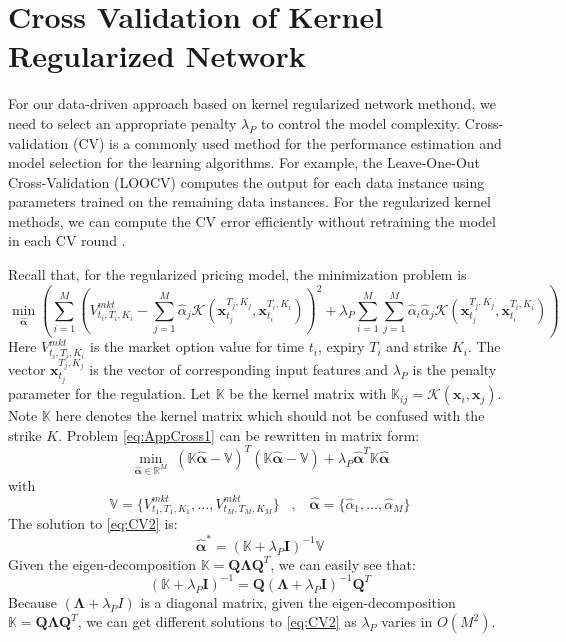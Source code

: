 \documentclass[letterpaper,12pt,titlepage,oneside,final]{book}
\numberwithin{equation}{section}
\theoremstyle{definition}
\newcommand{\vx}{\mathbf{x}}
\newcommand{\Real}{\mathbb{R}}
\newcommand{\valpha}{\pmb{\widehat{\alpha}}}
\newcommand{\vK}{\mathbb{K}}
\newcommand{\Vmkt}{V^{mkt}}
\newcommand{\vecVmkt}{\mathbb{V}}
\begin{document}
\chapter{Cross Validation of Kernel Regularized Network} \label{sec:cross}
\renewcommand{\theequation}{\thechapter.\arabic{equation}}
\renewcommand{\thethm}{\thechapter.\arabic{thm}}
 For our data-driven approach based on kernel regularized network methond, we need to select an appropriate penalty $\lambda_P$ to control the model complexity. Cross-validation (CV) is a commonly used method for the performance estimation and model selection for the learning algorithms. For example, the Leave-One-Out Cross-Validation (LOOCV) computes the output for each data instance using parameters trained on the remaining data instances. For the regularized kernel methods, we can compute the CV error efficiently without retraining the model in each CV round \cite{pahikkala2006fast, wahba1990spline}. 


Recall that, for the regularized  pricing model, the minimization problem is
\begin{equation}
\min_{\mathbf{\valpha}} \left(  \sum_{i=1}^M \left( \Vmkt_{t_i,T_i,K_i}-\sum_{j=1}^M \widehat{\alpha}_j \mathcal{K}(\vx_{t_j}^{T_j,K_j},\vx_{t_i}^{T_i,K_i}) \right)^2+\lambda_P \sum_{i=1}^M\sum_{j=1}^M  \widehat{\alpha}_i \widehat{\alpha}_j \mathcal{K}(\vx_{t_j}^{T_j,K_j},\vx_{t_i}^{T_i,K_i})\right)
\label{eq:AppCross1}
\end{equation}
Here $\Vmkt_{t_i,T_i,K_i}$ is the market option value for time $t_i$, expiry $T_i$ and strike $K_i$. The vector $\vx_{t_j}^{T_j,K_j}$ is the vector of  corresponding input features and $\lambda_P$ is the penalty parameter for the regulation. Let $\vK$ be the kernel matrix with $\vK_{ij}=\mathcal{K}(\mathbf{x}_i,\mathbf{x}_j)$. Note $\vK$ here denotes the kernel matrix which should not be confused with the strike $K$. Problem \eqref{eq:AppCross1} can be rewritten in matrix form:
\begin{equation}
\min_{\valpha \in \Real^M} \; ( \vK \valpha - \vecVmkt)^T ( \vK \valpha -\vecVmkt)+ \lambda_P \valpha^T\vK\valpha
\label{eq:CV2}
\end{equation}
with
\[
	\vecVmkt=\{
	\Vmkt_{t_1,T_1,K_1},\dots,	\Vmkt_{t_M,T_M,K_M}
	\}	\;\;\;,\;\;\; \valpha=\{\widehat{\alpha}_1,\dots,\widehat{\alpha}_M\}
\]
The solution to \eqref{eq:CV2} is:
\[
\valpha^*  =(\vK+\lambda_P \pmb{I})^{-1}\vecVmkt
\]
Given the eigen-decomposition $\vK=\pmb{Q} \pmb{\Lambda} \pmb{Q}^T$, we can easily see that:
\begin{equation}\label{eq:eig}
(\vK+\lambda_P \pmb{I})^{-1}=\pmb{Q}(\pmb{\Lambda}+\lambda_P \pmb{I})^{-1} \pmb{Q}^T
\end{equation}
Because $(\pmb{\Lambda}+\lambda_P I)$ is a diagonal matrix, given the eigen-decomposition $\vK=\pmb{Q} \pmb{\Lambda} \pmb{Q}^T$, we can get different solutions to \eqref{eq:CV2}  as $\lambda_P$ varies in $O(M^2)$.
\end{document}

